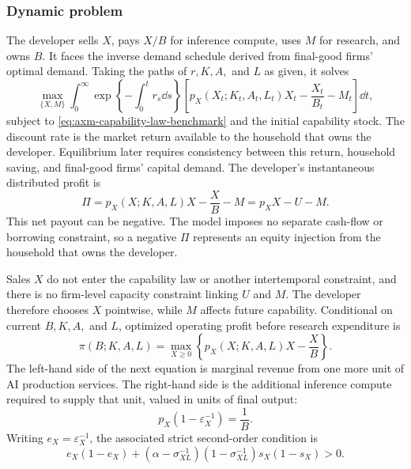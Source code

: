 \subsubsection{Dynamic problem}

The developer sells \(X\), pays \(X/B\) for inference compute, uses \(M\) for
research, and owns \(B\). It faces the inverse demand schedule derived from
final-good firms' optimal demand. Taking the paths of \(r,K,A,\) and \(L\) as
given, it solves
\begin{equation}
 \max_{\{X,M\}}
 \int_0^\infty
 \exp\left\{-\int_0^t r_s\dd s\right\}
 \left[p_X(X_t;K_t,A_t,L_t)X_t-\frac{X_t}{B_t}-M_t\right]\dd t,
 \label{eq:axm-developer-problem-benchmark}
\end{equation}
subject to \eqref{eq:axm-capability-law-benchmark} and the initial capability
stock. The discount rate is the market return available to the household that
owns the developer. Equilibrium later requires consistency between this return,
household saving, and final-good firms' capital demand. The developer's
instantaneous distributed profit is
\begin{equation}
 \Pi=p_X(X;K,A,L)X-\frac{X}{B}-M=p_XX-U-M.
 \label{eq:axm-developer-profit-benchmark}
\end{equation}
This net payout can be negative. The model imposes no separate cash-flow or
borrowing constraint, so a negative \(\Pi\) represents an equity injection from
the household that owns the developer.

Sales \(X\) do not enter the capability law or another intertemporal constraint,
and there is no firm-level capacity constraint linking \(U\) and \(M\). The
developer therefore chooses \(X\) pointwise, while \(M\) affects future
capability. Conditional on current \(B,K,A,\) and \(L\), optimized operating
profit before research expenditure is
\begin{equation}
 \pi(B;K,A,L)=\max_{X\geq0}
 \left\{p_X(X;K,A,L)X-\frac{X}{B}\right\}.
 \label{eq:axm-service-supply}
\end{equation}
The left-hand side of the next equation is marginal revenue from one more unit
of AI production services. The right-hand side is the additional inference
compute required to supply that unit, valued in units of final output:
\begin{equation}
 p_X(1-\varepsilon_X^{-1})=\frac{1}{B}.
 \label{eq:axm-monopoly-foc}
\end{equation}
Writing \(e_X=\varepsilon_X^{-1}\), the associated strict second-order
condition is
\begin{equation}
 e_X(1-e_X)
 +(\alpha-\sigma_{XL}^{-1})(1-\sigma_{XL}^{-1})s_X(1-s_X)>0.
 \label{eq:axm-monopoly-soc}
\end{equation}

